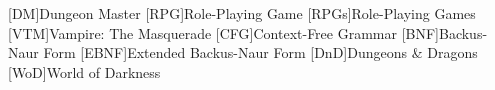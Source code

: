 [DM]{Dungeon Master}
[RPG]{Role-Playing Game}
[RPGs]{Role-Playing Games}
[VTM]{Vampire: The Masquerade}
[CFG]{Context-Free Grammar}
[BNF]{Backus-Naur Form}
[EBNF]{Extended Backus-Naur Form}
[DnD]{Dungeons \& Dragons}
[WoD]{World of Darkness}
